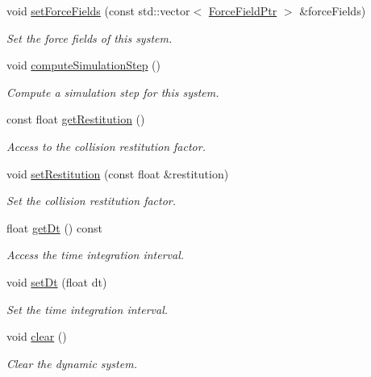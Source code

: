 \begin{DoxyCompactItemize}
void \hyperlink{classDynamicSystem_a143060ff8db4e74be75f27bbac6aa0ba}{set\+Force\+Fields} (const std\+::vector$<$ \hyperlink{ForceField_8hpp_a42f2dc2cbbb9e0d734b92850c7b40d58}{Force\+Field\+Ptr} $>$ \&force\+Fields)
\begin{DoxyCompactList}\small\item\em Set the force fields of this system. \end{DoxyCompactList}\item 
void \hyperlink{classDynamicSystem_a42208a46a324ab70914c3827195e321e}{compute\+Simulation\+Step} ()
\begin{DoxyCompactList}\small\item\em Compute a simulation step for this system. \end{DoxyCompactList}\item 
const float \hyperlink{classDynamicSystem_a9b6e65a5069badbe045d96d3b53e6b1e}{get\+Restitution} ()
\begin{DoxyCompactList}\small\item\em Access to the collision restitution factor. \end{DoxyCompactList}\item 
void \hyperlink{classDynamicSystem_a2de9e23958d31a30b393c59f1c789d6f}{set\+Restitution} (const float \&restitution)
\begin{DoxyCompactList}\small\item\em Set the collision restitution factor. \end{DoxyCompactList}\item 
float \hyperlink{classDynamicSystem_a41466bee21e4bbc68f605fa2e3df6155}{get\+Dt} () const 
\begin{DoxyCompactList}\small\item\em Access the time integration interval. \end{DoxyCompactList}\item 
void \hyperlink{classDynamicSystem_a1ab34116e7d28e28bac5f1ed0da7f331}{set\+Dt} (float dt)
\begin{DoxyCompactList}\small\item\em Set the time integration interval. \end{DoxyCompactList}\item 
void \hyperlink{classDynamicSystem_abad9463e7a0dd62566bfe91a573c7ef5}{clear} ()
\begin{DoxyCompactList}\small\item\em Clear the dynamic system. \end{DoxyCompactList}\end{DoxyCompactItemize}
